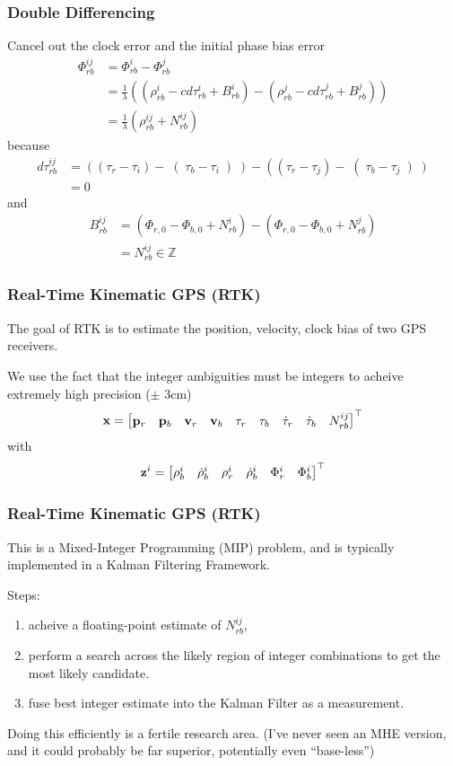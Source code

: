\documentclass{beamer}
\begin{document}
\begin{frame}\frametitle{Double Differencing}
Cancel out the clock error and the initial phase bias error
\begin{align*}
	\Phi_{rb}^{ij} &=\Phi_{rb}^{i}-\Phi_{rb}^{j} \nonumber\\
	&= \frac{1}{\lambda} \left(\left(\rho_{rb}^i -cd\tau_{rb}^i + B_{rb}^i\right) - \left(\rho_{rb}^j -cd\tau_{rb}^j + B_{rb}^j \right)\right)\\
	&= \frac{1}{\lambda} \left( \rho_{rb}^{ij} + N_{rb}^{ij} \right)
\end{align*}
because 
\begin{align*}
	d\tau_{rb}^{ij} &= \left( \left( \tau_r - \tau_i \right) - \right( \tau_b - \tau_i \left) \right) - \left( \left( \tau_r - \tau_j \right) - \right( \tau_b - \tau_j \left) \right) \\
	&= 0
\end{align*}
and
\begin{align*}
	B_{rb}^{ij} &= \left(\Phi_{r,0}-\Phi_{b,0}+N_{rb}^{i}\right) - \left(\Phi_{r,0}-\Phi_{b,0}+N_{rb}^{j}\right) \\
	&= N_{rb}^{ij} \in \mathbb{Z}
\end{align*}
\end{frame}

\begin{frame}\frametitle{Real-Time Kinematic GPS (RTK)}
   The goal of RTK is to estimate the position, velocity, clock bias of two GPS receivers.

   We use the fact that the integer ambiguities must be integers to acheive extremely high precision ($\pm$ 3cm) 
\begin{equation*}
   \mathbf{x} = \begin{bmatrix} \mathbf{p}_r & \mathbf{p}_b & \mathbf{v}_r & \mathbf{v}_b & \tau_r & \tau_b & \dot{\tau}_r & \dot{\tau}_b & N_{rb}^{ij}\end{bmatrix} ^\top 
\end{equation*}
with
\begin{equation*}
	\mathbf{z}^i = \begin{bmatrix} \rho_b^i & \dot{\rho}_b^i & \rho_r^i & \dot{\rho}_b^i & \Phi_r^i & \Phi_b^i \end{bmatrix} ^\top
\end{equation*}
\end{frame}

\begin{frame}\frametitle{Real-Time Kinematic GPS (RTK)}
This is a Mixed-Integer Programming (MIP) problem, and is typically implemented in a Kalman Filtering Framework.

Steps:
\begin{enumerate}
	\item acheive a floating-point estimate of $N_{rb}^{ij}$,
	\item perform a search across the likely region of integer combinations to get the most likely candidate.
	\item fuse best integer estimate into the Kalman Filter as a measurement.
\end{enumerate}
Doing this efficiently is a fertile research area. (I've never seen an MHE version, and it could probably be far superior, potentially even ``base-less'')
\end{frame}
\end{document}
